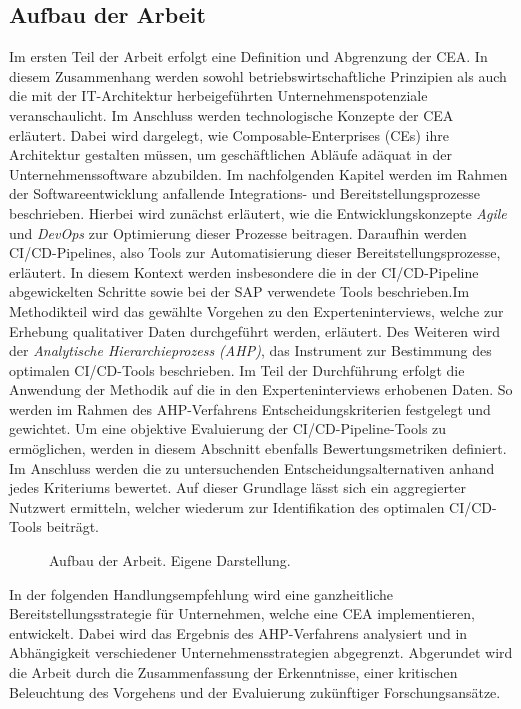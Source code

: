 \subsection{Aufbau der Arbeit}
Im ersten Teil der Arbeit erfolgt eine Definition und Abgrenzung der CEA. In diesem Zusammenhang werden sowohl betriebswirtschaftliche Prinzipien als auch die mit der IT-Architektur herbeigeführten Unternehmenspotenziale veranschaulicht. Im Anschluss werden technologische Konzepte der CEA erläutert. Dabei wird dargelegt, wie Composable-Enterprises (\acs{CE}s) ihre Architektur gestalten müssen, um geschäftlichen Abläufe adäquat in der Unternehmenssoftware abzubilden. Im nachfolgenden Kapitel werden im Rahmen der Softwareentwicklung anfallende Integrations- und Bereitstellungsprozesse beschrieben. Hierbei wird zunächst erläutert, wie die Entwicklungskonzepte \textit{Agile} und \textit{DevOps} zur Optimierung dieser Prozesse beitragen. Daraufhin werden CI/CD-Pipelines, also Tools zur Automatisierung dieser Bereitstellungsprozesse, erläutert. In diesem Kontext werden insbesondere die in der CI/CD-Pipeline abgewickelten Schritte sowie bei der SAP verwendete Tools beschrieben.Im Methodikteil wird das gewählte Vorgehen zu den Experteninterviews, welche zur Erhebung qualitativer Daten durchgeführt werden, erläutert. Des Weiteren wird der \textit{Analytische Hierarchieprozess (\acs{AHP})}, das Instrument zur Bestimmung des optimalen CI/CD-Tools beschrieben. Im Teil der Durchführung erfolgt die Anwendung der Methodik auf die in den Experteninterviews erhobenen Daten. So werden im Rahmen des AHP-Verfahrens Entscheidungskriterien festgelegt und gewichtet. Um eine objektive Evaluierung der CI/CD-Pipeline-Tools zu ermöglichen, werden in diesem Abschnitt ebenfalls Bewertungsmetriken definiert. Im Anschluss werden die zu untersuchenden Entscheidungsalternativen anhand jedes Kriteriums bewertet. Auf dieser Grundlage lässt sich ein aggregierter Nutzwert ermitteln, welcher wiederum zur Identifikation des optimalen CI/CD-Tools beiträgt. 
\begin{center}
	\begin{figure}[H]
		\centering
		\caption[Aufbau der Arbeit]{Aufbau der Arbeit. Eigene Darstellung.}
		\label{fig:Aufbau}
	\end{figure}	
\end{center}
\vspace*{-15mm}
In der folgenden Handlungsempfehlung wird eine ganzheitliche Bereitstellungsstrategie für Unternehmen, welche eine CEA implementieren, entwickelt. Dabei wird das Ergebnis des AHP-Verfahrens analysiert und in Abhängigkeit verschiedener Unternehmensstrategien abgegrenzt. Abgerundet wird die Arbeit durch die Zusammenfassung der Erkenntnisse, einer kritischen Beleuchtung des Vorgehens und der Evaluierung zukünftiger Forschungsansätze. 

